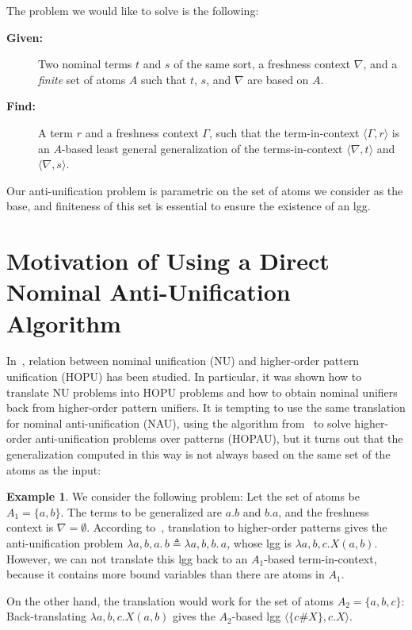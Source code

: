\documentclass[11pt,a4paper]{amsart}
\theoremstyle{definition}
\newtheorem{example}{Example}
\newcommand{\np}[2]{\langle #1, \allowbreak #2\rangle}
\begin{document}
The problem we would like to solve is the following: 
\vspace{0.2cm}
\begin{description}
  \item[\bf Given:] Two nominal terms $ t$ and $ s$ of the same
    sort, a freshness context $\nabla$, and a \emph{finite} set of atoms $A$
    such that $ t$, $ s$, and $\nabla$ are based on $A$.  
  \item[\bf Find:] A term $ r$ and a freshness context $\Gamma$, such
    that the term-in-context $\np{\Gamma}{r}$ is an $A$-based least
    general generalization of the terms-in-context $\np{\nabla}{t}$
    and $\np{\nabla}{s}$.
\end{description}
\vspace{0.2cm}


Our anti-unification problem is parametric on the set of atoms we
consider as the base, and finiteness of this set is essential to
ensure the existence of an lgg.  

\section{Motivation of Using a Direct Nominal Anti-Unification Algorithm}
\label{sect:motivation}

In~\cite{DBLP:journals/tocl/LevyV12}, relation between nominal
unification (NU) and higher-order pattern unification (HOPU) has been
studied. In particular, it was shown how to translate NU problems into
HOPU problems and how to obtain nominal unifiers back from
higher-order pattern unifiers. It is tempting to use the same
translation for nominal anti-unification (NAU), using the algorithm
from~\cite{DBLP:conf/rta/BaumgartnerKLV13} to solve higher-order
anti-unification problems over patterns (HOPAU), but it turns out that
the generalization computed in this way is not always based on the
same set of the atoms as the input:

\begin{example}
\label{exmp:translation}
We consider the following problem:
Let the set of atoms be $A_1=\{a,b\}$. The terms to be generalized are $a.b$ and $b.a$, and the freshness context is $\nabla=\emptyset$.
According to~\cite{DBLP:journals/tocl/LevyV12}, translation to higher-order patterns
gives the anti-unification problem $\lambda a,b,a.\,b \triangleq
\lambda a,b,b.\,a$, whose lgg is $\lambda a,b,c. X(a,b)$. However, we
can not translate this lgg back to an $A_1$-based term-in-context,
because it contains more bound variables than there are atoms in
$A_1$.

On the other hand, the translation would work for the 
set of atoms $A_2=\{a,b,c\}$:
Back-translating $\lambda
a,b,c. X(a,b)$ gives the $A_2$-based lgg $\np{\{c\#X\}}{c.X}$.
\end{example}
\end{document}
